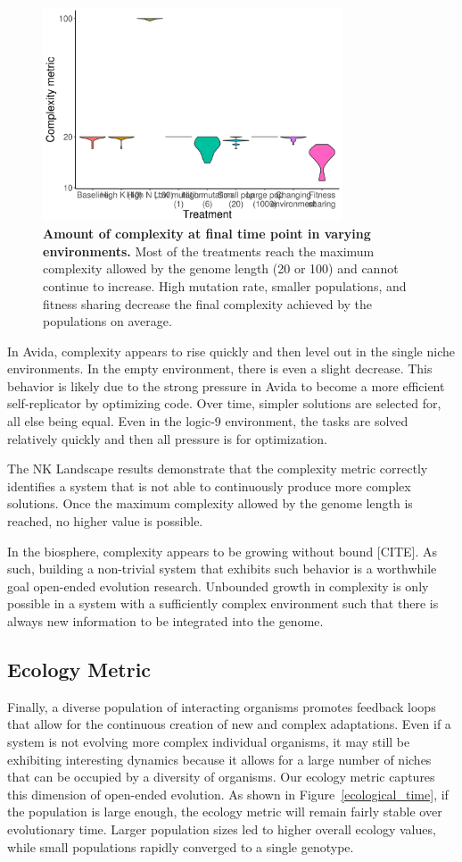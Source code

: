 \documentclass[letterpaper]{article}
\begin{document}
\begin{figure}
\includegraphics[width=3.5in]{figs/complexityboxplots.png}
\caption{\textbf{Amount of complexity at final time point in varying environments.} Most of the treatments reach the maximum complexity allowed by the genome length (20 or 100) and cannot continue to increase. High mutation rate, smaller populations, and fitness sharing decrease the final complexity achieved by the populations on average.}
\label{complexity}
\end{figure}

In Avida, complexity appears to rise quickly and then level out in the single niche environments. In the empty environment, there is even a slight decrease. This behavior is likely due to the strong pressure in Avida to become a more efficient self-replicator by optimizing code. Over time, simpler solutions are selected for, all else being equal. Even in the logic-9 environment, the tasks are solved relatively quickly and then all pressure is for optimization.

The NK Landscape results demonstrate that the complexity metric correctly identifies a system that is not able to continuously produce more complex solutions. Once the maximum complexity allowed by the genome length is reached, no higher value is possible.  

In the biosphere, complexity appears to be growing without bound [CITE]. As such, building a non-trivial system that exhibits such behavior is a worthwhile goal open-ended evolution research. Unbounded growth in complexity is only possible in a system with a sufficiently complex environment such that there is always new information to be integrated into the genome.

\subsection{Ecology Metric}
Finally, a diverse population of interacting organisms promotes feedback loops that allow for the continuous creation of new and complex adaptations. Even if a system is not evolving more complex individual organisms, it may still be exhibiting interesting dynamics because it allows for a large number of niches that can be occupied by a diversity of organisms. Our ecology metric captures this dimension of open-ended evolution. As shown in Figure~\ref{ecological_time}, if the population is large enough, the ecology metric will remain fairly stable over evolutionary time. Larger population sizes led to higher overall ecology values, while small populations rapidly converged to a single genotype.
\end{document}
